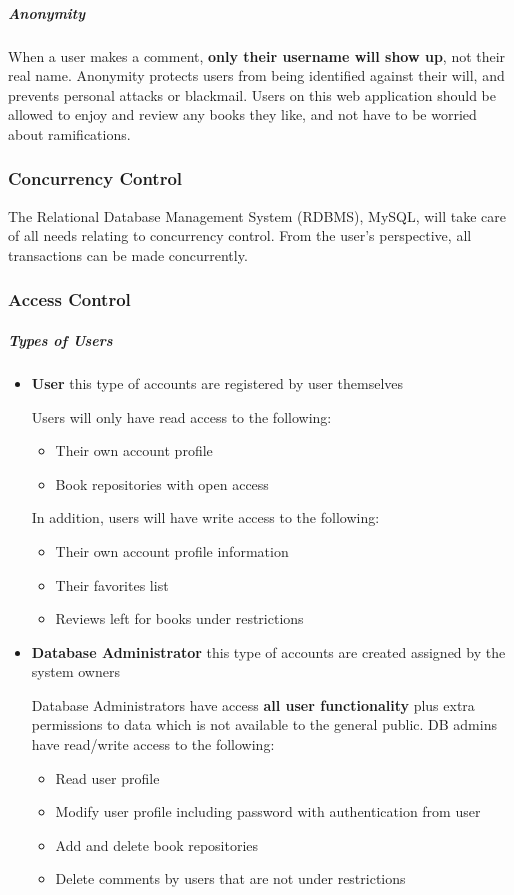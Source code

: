 \documentclass[letter, 12pt, titlepage]{article}
\begin{document}
			\subparagraph{Anonymity}
				When a user makes a comment, \textbf{only their username will show up}, not their real name. Anonymity protects users from being identified against their will, and prevents personal attacks or blackmail. Users on this web application should be allowed to enjoy and review any books they like, and not have to be worried about ramifications.
		
		\subsubsection{Concurrency Control}
			The Relational Database Management System (RDBMS), MySQL, will take care of all needs relating to concurrency control. From the user's perspective, all transactions can be made concurrently. 

		\subsubsection{Access Control}

			\subparagraph{Types of Users}
				\begin{itemize} 
					\item \textbf{User}		
						this type of accounts are registered by user themselves 


						Users will only have read access to the following:
						\begin{itemize}
							\item  Their own account profile
							\item  Book repositories with open access
						\end{itemize}


					 In addition, users will have write access to the following:
						\begin{itemize}
							\item  Their own account profile information
							\item  Their favorites list
							\item  Reviews left for books under restrictions
						\end{itemize}

					\item \textbf{Database Administrator}
						this type of accounts are created assigned by the system owners


						Database Administrators have access \textbf{all user functionality} plus extra permissions to data which is not available to the general public. DB admins have read/write access to the following: 			
						\begin{itemize}
							\item Read user profile
							\item Modify user profile including password with authentication from user
							\item Add and delete book repositories
							\item Delete comments by users that are not under restrictions
		  			\end{itemize}
				\end{itemize}
\end{document}
